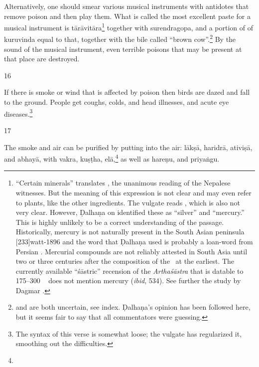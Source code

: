 \begin{translation}
Alternatively, one should smear  various musical instruments with
antidotes that remove poison and then play  them. What is called the
most  excellent paste for a musical instrument is
\gls{tārāvitāra}\footnote{“Certain  minerals” translates
    , the unanimous  reading of the Nepalese  witnesses.
    But the meaning of this expression is not  clear and may even refer to
    plants, like the other ingredients.  The vulgate  reads ,  which is also not very clear.  However, Ḍalhaṇa on
     identified  these as “silver” and “mercury.” This is
    highly unlikely  to be a correct understanding of  the passage.
    Historically, mercury is not  naturally present in the South  Asian
    peninsula [233]{watt-1896}  and the word  that
    Ḍalhaṇa used is probably a loan-word from  Persian \citep[sub
    \emph{paranda, parranda}][244b]{stei-pers}. Mercurial compounds are
    not  reliably attested in South Asia until two or three  centuries
    after the composition  of the \SS\ at the earliest.  The currently
    available  “śāstric” recension of the  \emph{Arthaśāstra} that is
    datable to 175--300 \CE\  \citep[29--31]{oliv-2013} does  not mention
    mercury (\emph{ibid}, 534). See further the study by  Dagmar \citet[17,
    \emph{et passim}]{wuja-2013b}.}  together with  \gls{surendragopa},
    and a  portion of of \gls{kuruvinda} equal to that,  together with the
    bile called  “brown cow”.\footnote{  and
         are both  uncertain, see index. Ḍalhaṇa's opinion has
        been followed here, but it  seems fair to say that all commentators
        were  guessing.} By the sound of  the musical instrument, even
        terrible poisons that may be present  at that place are destroyed.

\item [16]  

If there is smoke or wind that  is affected by poison then  birds are
dazed and fall to the ground.  People get  coughs, colds, and head 
illnesses, and acute eye diseases.\footnote{The syntax  of this verse
    is somewhat  loose; the vulgate has regularized it, smoothing  out
    the difficulties.}

\item
[17]  

The smoke and air can be  purified by putting into the  air:  \gls{lākṣā}, 
\gls{haridrā}, \gls{ativiṣā}, and \gls{abhayā}, with \gls{vakra}, \gls{kuṣṭha}, 
\gls{elā},\footnote{} as well as \gls{hareṇu}, and \gls{priyaṅgu}.  
\end{translation}  


